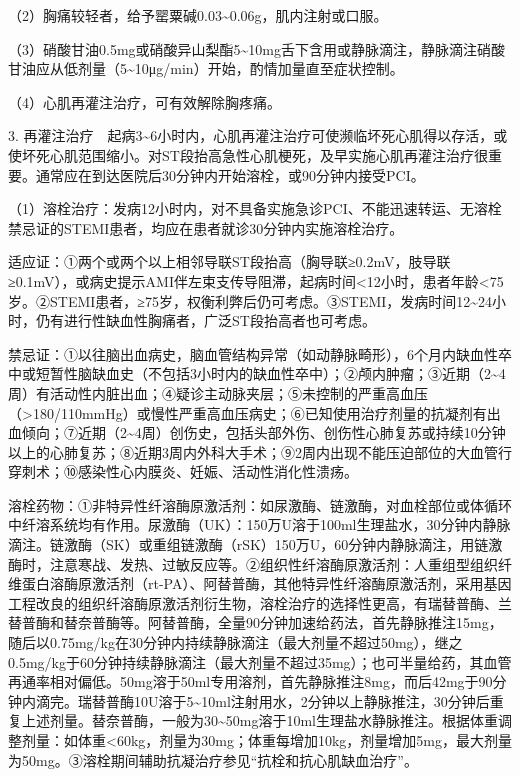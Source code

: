 （2）胸痛较轻者，给予罂粟碱0.03\textasciitilde{}0.06g，肌内注射或口服。

（3）硝酸甘油0.5mg或硝酸异山梨酯5\textasciitilde{}10mg舌下含用或静脉滴注，静脉滴注硝酸甘油应从低剂量（5\textasciitilde{}10μg/min）开始，酌情加量直至症状控制。

（4）心肌再灌注治疗，可有效解除胸疼痛。

3.
再灌注治疗　起病3\textasciitilde{}6小时内，心肌再灌注治疗可使濒临坏死心肌得以存活，或使坏死心肌范围缩小。对ST段抬高急性心肌梗死，及早实施心肌再灌注治疗很重要。通常应在到达医院后30分钟内开始溶栓，或90分钟内接受PCI。

（1）溶栓治疗：发病12小时内，对不具备实施急诊PCI、不能迅速转运、无溶栓禁忌证的STEMI患者，均应在患者就诊30分钟内实施溶栓治疗。

适应证：①两个或两个以上相邻导联ST段抬高（胸导联≥0.2mV，肢导联≥0.1mV），或病史提示AMI伴左束支传导阻滞，起病时间\textless{}12小时，患者年龄\textless{}75岁。②STEMI患者，≥75岁，权衡利弊后仍可考虑。③STEMI，发病时间12\textasciitilde{}24小时，仍有进行性缺血性胸痛者，广泛ST段抬高者也可考虑。

禁忌证：①以往脑出血病史，脑血管结构异常（如动静脉畸形），6个月内缺血性卒中或短暂性脑缺血史（不包括3小时内的缺血性卒中）；②颅内肿瘤；③近期（2\textasciitilde{}4周）有活动性内脏出血；④疑诊主动脉夹层；⑤未控制的严重高血压（\textgreater{}180/110mmHg）或慢性严重高血压病史；⑥已知使用治疗剂量的抗凝剂有出血倾向；⑦近期（2\textasciitilde{}4周）创伤史，包括头部外伤、创伤性心肺复苏或持续10分钟以上的心肺复苏；⑧近期3周内外科大手术；⑨2周内出现不能压迫部位的大血管行穿刺术；⑩感染性心内膜炎、妊娠、活动性消化性溃疡。

溶栓药物：①非特异性纤溶酶原激活剂：如尿激酶、链激酶，对血栓部位或体循环中纤溶系统均有作用。尿激酶（UK）：150万U溶于100ml生理盐水，30分钟内静脉滴注。链激酶（SK）或重组链激酶（rSK）150万U，60分钟内静脉滴注，用链激酶时，注意寒战、发热、过敏反应等。②组织性纤溶酶原激活剂：人重组型组织纤维蛋白溶酶原激活剂（rt-PA）、阿替普酶，其他特异性纤溶酶原激活剂，采用基因工程改良的组织纤溶酶原激活剂衍生物，溶栓治疗的选择性更高，有瑞替普酶、兰替普酶和替奈普酶等。阿替普酶，全量90分钟加速给药法，首先静脉推注15mg，随后以0.75mg/kg在30分钟内持续静脉滴注（最大剂量不超过50mg），继之0.5mg/kg于60分钟持续静脉滴注（最大剂量不超过35mg）；也可半量给药，其血管再通率相对偏低。50mg溶于50ml专用溶剂，首先静脉推注8mg，而后42mg于90分钟内滴完。瑞替普酶10U溶于5\textasciitilde{}10ml注射用水，2分钟以上静脉推注，30分钟后重复上述剂量。替奈普酶，一般为30\textasciitilde{}50mg溶于10ml生理盐水静脉推注。根据体重调整剂量：如体重\textless{}60kg，剂量为30mg；体重每增加10kg，剂量增加5mg，最大剂量为50mg。③溶栓期间辅助抗凝治疗参见“抗栓和抗心肌缺血治疗”。


